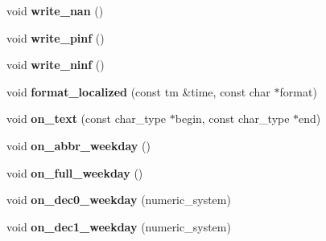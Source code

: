\begin{DoxyCompactItemize}
\item 
\mbox{\label{structinternal_1_1chrono__formatter_a53c32b87fb16b7f0d5431b6bbd4f8133}} 
void {\bfseries write\+\_\+nan} ()
\item 
\mbox{\label{structinternal_1_1chrono__formatter_a0b5a1c8606fc46eef627fb1f5068a6ab}} 
void {\bfseries write\+\_\+pinf} ()
\item 
\mbox{\label{structinternal_1_1chrono__formatter_a87f67d63e1191923387de7cb3a2b8da9}} 
void {\bfseries write\+\_\+ninf} ()
\item 
\mbox{\label{structinternal_1_1chrono__formatter_a8f71a707d3945556dace9e1d3d74bc1d}} 
void {\bfseries format\+\_\+localized} (const tm \&time, const char $\ast$format)
\item 
\mbox{\label{structinternal_1_1chrono__formatter_abba76d8a6a28c064a6d68b941901f174}} 
void {\bfseries on\+\_\+text} (const char\+\_\+type $\ast$begin, const char\+\_\+type $\ast$end)
\item 
\mbox{\label{structinternal_1_1chrono__formatter_aaed60a2f6f5b3f9adf2fb96dbe5aa892}} 
void {\bfseries on\+\_\+abbr\+\_\+weekday} ()
\item 
\mbox{\label{structinternal_1_1chrono__formatter_a98d3ab2ed7b03a57fea663e823893275}} 
void {\bfseries on\+\_\+full\+\_\+weekday} ()
\item 
\mbox{\label{structinternal_1_1chrono__formatter_af676eef777c4660b0e52871fbb6b22ce}} 
void {\bfseries on\+\_\+dec0\+\_\+weekday} (numeric\+\_\+system)
\item 
\mbox{\label{structinternal_1_1chrono__formatter_a4b79d5263e285b9b490b55dbf6c326b3}} 
void {\bfseries on\+\_\+dec1\+\_\+weekday} (numeric\+\_\+system)
\item 
\mbox{\label{structinternal_1_1chrono__formatter_ac38a1ba3aeeb629c046c5dbc0bc49e0e}} 

\end{DoxyCompactItemize}
